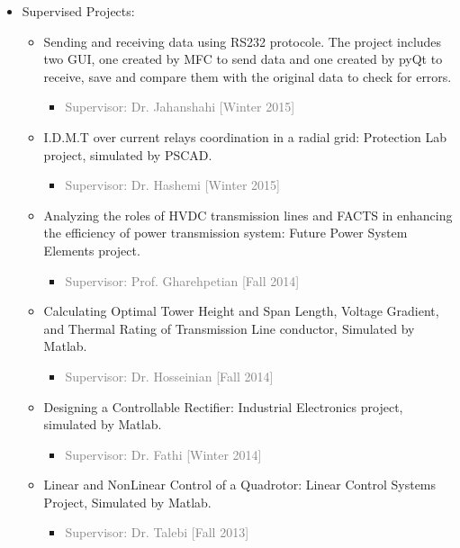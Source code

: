 \documentclass[10pt,a4paper,sans]{moderncv} %
\begin{document}
\begin{itemize}
	\item Supervised Projects:
	\begin{itemize}

		\item Sending and receiving data using RS232 protocole. The project includes two GUI, one created by MFC to send data and one created by pyQt to receive, save and compare them with the original data to check for errors.
		\begin{itemize}
			\item \textcolor{gray}{Supervisor: Dr. Jahanshahi [Winter 2015]}
		\end{itemize}
		
		\item  I.D.M.T over current relays coordination in a radial grid: Protection Lab project, simulated by PSCAD.
		 \begin{itemize}
		\item \textcolor{gray}{Supervisor: Dr. Hashemi [Winter 2015]}
		\end{itemize}
		
		 \item Analyzing the roles of HVDC transmission lines and FACTS in enhancing the eﬃciency of power transmission system: Future Power System Elements project.
		 \begin{itemize}
		\item \textcolor{gray}{Supervisor: Prof. Gharehpetian [Fall 2014]} 
		\end{itemize}
		 
		\item Calculating Optimal Tower Height and Span Length, Voltage Gradient, and Thermal Rating of Transmission Line conductor, Simulated by Matlab.
		\begin{itemize}
		\item \textcolor{gray}{Supervisor: Dr. Hosseinian [Fall 2014]}
		\end{itemize}
		
		\item Designing a Controllable Rectifier: Industrial Electronics project, simulated by Matlab.
		\begin{itemize}
		\item \textcolor{gray}{Supervisor: Dr. Fathi [Winter 2014]}
		\end{itemize}
		
		\item Linear and NonLinear Control of a Quadrotor: Linear Control Systems Project, Simulated by
		Matlab.
		\begin{itemize}
		\item \textcolor{gray}{Supervisor: Dr. Talebi [Fall 2013]}
		\end{itemize}
		

\end{itemize}
\end{itemize}
\end{document}

